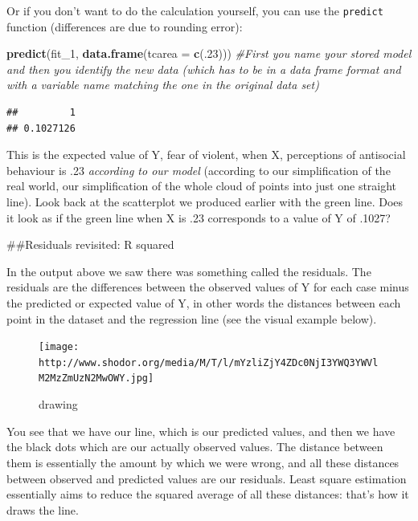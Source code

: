\documentclass[]{book}
\newenvironment{Shaded}{\begin{snugshade}}{\end{snugshade}}
\newcommand{\CommentTok}[1]{\textcolor[rgb]{0.56,0.35,0.01}{\textit{#1}}}
\newcommand{\DataTypeTok}[1]{\textcolor[rgb]{0.13,0.29,0.53}{#1}}
\newcommand{\DecValTok}[1]{\textcolor[rgb]{0.00,0.00,0.81}{#1}}
\newcommand{\KeywordTok}[1]{\textcolor[rgb]{0.13,0.29,0.53}{\textbf{#1}}}
\newcommand{\NormalTok}[1]{#1}
\theoremstyle{definition}
\theoremstyle{definition}
\theoremstyle{definition}
\theoremstyle{remark}
\begin{document}
Or if you don't want to do the calculation yourself, you can use the
\texttt{predict} function (differences are due to rounding error):

\begin{Shaded}
\begin{Highlighting}[]
\KeywordTok{predict}\NormalTok{(fit_}\DecValTok{1}\NormalTok{, }\KeywordTok{data.frame}\NormalTok{(}\DataTypeTok{tcarea =} \KeywordTok{c}\NormalTok{(.}\DecValTok{23}\NormalTok{))) }\CommentTok{#First you name your stored model and then you identify the new data (which has to be in a data frame format and with a variable name matching the one in the original data set)}
\end{Highlighting}
\end{Shaded}

\begin{verbatim}
##         1 
## 0.1027126
\end{verbatim}

This is the expected value of Y, fear of violent, when X, perceptions of
antisocial behaviour is .23 \emph{according to our model} (according to
our simplification of the real world, our simplification of the whole
cloud of points into just one straight line). Look back at the
scatterplot we produced earlier with the green line. Does it look as if
the green line when X is .23 corresponds to a value of Y of .1027?

\#\#Residuals revisited: R squared

In the output above we saw there was something called the residuals. The
residuals are the differences between the observed values of Y for each
case minus the predicted or expected value of Y, in other words the
distances between each point in the dataset and the regression line (see
the visual example below).

\begin{figure}
\centering
\texttt{[image: http://www.shodor.org/media/M/T/l/mYzliZjY4ZDc0NjI3YWQ3YWVlM2MzZmUzN2MwOWY.jpg]}
\caption{drawing}
\end{figure}

You see that we have our line, which is our predicted values, and then
we have the black dots which are our actually observed values. The
distance between them is essentially the amount by which we were wrong,
and all these distances between observed and predicted values are our
residuals. Least square estimation essentially aims to reduce the
squared average of all these distances: that's how it draws the line.
\end{document}
